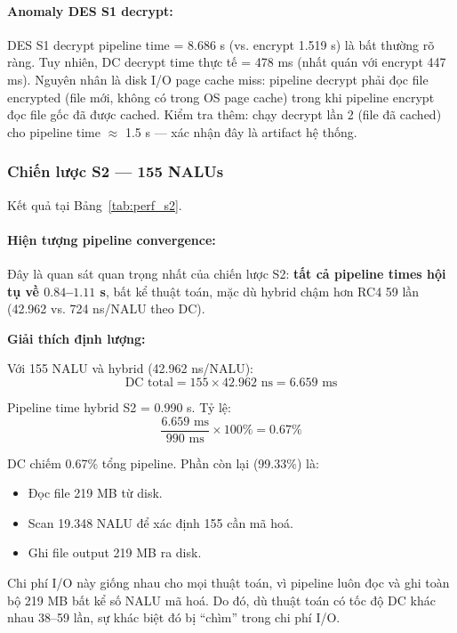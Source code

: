 \paragraph{Anomaly DES S1 decrypt:}

DES S1 decrypt pipeline time = 8.686 s (vs. encrypt 1.519 s) là bất thường rõ ràng.
Tuy nhiên, DC decrypt time thực tế = 478 ms (nhất quán với encrypt 447 ms).
Nguyên nhân là disk I/O page cache miss: pipeline decrypt phải đọc file encrypted
(file mới, không có trong OS page cache) trong khi pipeline encrypt đọc file gốc
đã được cached. Kiểm tra thêm: chạy decrypt lần 2 (file đã cached) cho pipeline
time $\approx$ 1.5 s --- xác nhận đây là artifact hệ thống.

\subsubsection{Chiến lược S2 --- 155 NALUs}

Kết quả tại Bảng~\ref{tab:perf_s2}.

\paragraph{Hiện tượng pipeline convergence:}

Đây là quan sát quan trọng nhất của chiến lược S2: \textbf{tất cả pipeline times
hội tụ về $0.84$--$1.11$ s}, bất kể thuật toán, mặc dù hybrid chậm hơn RC4 59 lần
(42.962 vs. 724 ns/NALU theo DC).

\textbf{Giải thích định lượng:}

Với 155 NALU và hybrid (42.962 ns/NALU):
\begin{equation}
\text{DC total} = 155 \times 42.962 \text{ ns} = 6.659 \text{ ms}
\end{equation}

Pipeline time hybrid S2 = 0.990 s. Tỷ lệ:
\begin{equation}
\frac{6.659 \text{ ms}}{990 \text{ ms}} \times 100\% = 0.67\%
\end{equation}

DC chiếm 0.67\% tổng pipeline. Phần còn lại (99.33\%) là:
\begin{itemize}
  \item Đọc file 219 MB từ disk.
  \item Scan 19.348 NALU để xác định 155 cần mã hoá.
  \item Ghi file output 219 MB ra disk.
\end{itemize}

Chi phí I/O này giống nhau cho mọi thuật toán, vì pipeline luôn đọc và ghi
toàn bộ 219 MB bất kể số NALU mã hoá. Do đó, dù thuật toán có tốc độ DC
khác nhau 38--59 lần, sự khác biệt đó bị ``chìm'' trong chi phí I/O.

